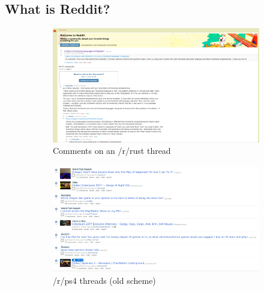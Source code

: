 \documentclass[12pt, a4paper]{article}
\begin{document}
\subsection{What is Reddit?}
\begin{figure}[h!]
  \centering
  \begin{subfigure}[b]{0.4\linewidth}
    \includegraphics[width=\linewidth]{reddit_rust_comments.png}
    \caption{Comments on an /r/rust thread}
  \end{subfigure}
  \begin{subfigure}[b]{0.4\linewidth}
    \includegraphics[width=\linewidth]{reddit_ps4.png}
    \caption{/r/ps4 threads (old scheme)}
  \end{subfigure}
  \begin{subfigure}[b]{0.4\linewidth}

\end{subfigure}
\end{figure}
\end{document}
